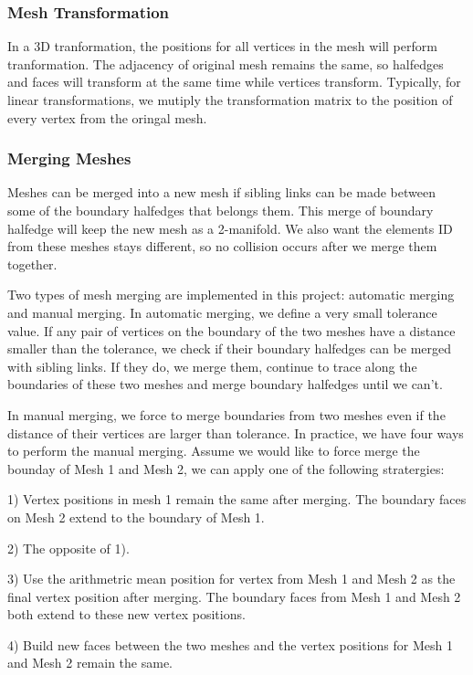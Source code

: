 \documentclass[12pt]{article}
\begin{document}
\subsubsection{Mesh Transformation}
In a 3D tranformation, the positions for all vertices in the mesh will perform tranformation. The adjacency of original mesh remains the same, so halfedges and faces will transform at the same time while vertices transform. Typically, for linear transformations, we mutiply the transformation matrix to the position of every vertex from the oringal mesh.

\subsubsection{Merging Meshes}
Meshes can be merged into a new mesh if sibling links can be made between some of the boundary halfedges that belongs them. This merge of boundary halfedge will keep the new mesh as a 2-manifold. We also want the elements ID from these meshes stays different, so no collision occurs after we merge them together.

Two types of mesh merging are implemented in this project: automatic merging and manual merging. In automatic merging, we define a very small tolerance value. If any pair of vertices on the boundary of the two meshes have a distance smaller than the tolerance, we check if their boundary halfedges can be merged with sibling links. If they do, we merge them, continue to trace along the boundaries of these two meshes and merge boundary halfedges until we can't.

In manual merging, we force to merge boundaries from two meshes even if the distance of their vertices are larger than tolerance. In practice, we have four ways to perform the manual merging. Assume we would like to force merge the bounday of Mesh 1 and Mesh 2, we can apply one of the following stratergies:

1) Vertex positions in mesh 1 remain the same after merging. The boundary faces on Mesh 2 extend to the boundary of Mesh 1.

2) The opposite of 1).

3) Use the arithmetric mean position for vertex from Mesh 1 and Mesh 2 as the final vertex position after merging. The boundary faces from Mesh 1 and Mesh 2 both extend to these new vertex positions.

4) Build new faces between the two meshes and the vertex positions for Mesh 1 and Mesh 2 remain the same.
\end{document}
